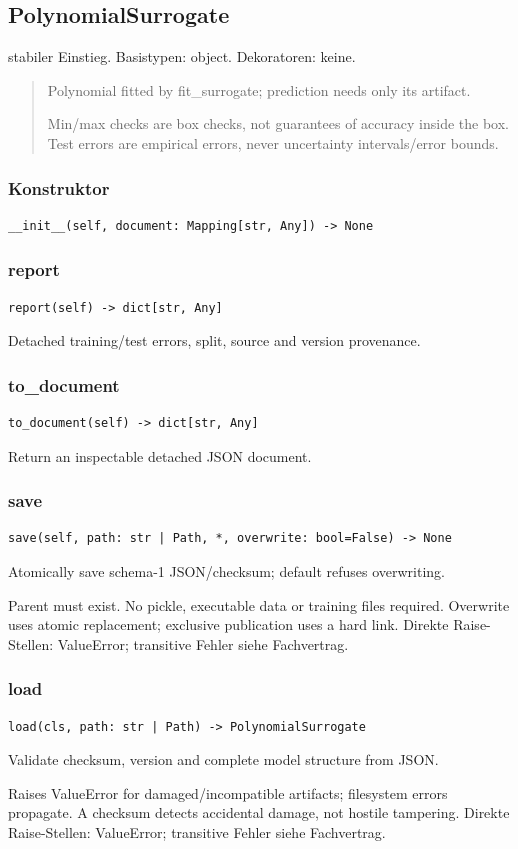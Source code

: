 \subsection{PolynomialSurrogate}
stabiler Einstieg.
Basistypen: object. Dekoratoren: keine.
\begin{quote}
Polynomial fitted by fit\_surrogate; prediction needs only its artifact.\par Min/max checks are box checks, not guarantees of accuracy inside the box. Test errors are empirical errors, never uncertainty intervals/error bounds.
\end{quote}
\subsubsection*{Konstruktor}
\begin{lstlisting}
__init__(self, document: Mapping[str, Any]) -> None
\end{lstlisting}
\subsubsection*{report}
\begin{lstlisting}
report(self) -> dict[str, Any]
\end{lstlisting}
Detached training/test errors, split, source and version provenance.
\subsubsection*{to\_document}
\begin{lstlisting}
to_document(self) -> dict[str, Any]
\end{lstlisting}
Return an inspectable detached JSON document.
\subsubsection*{save}
\begin{lstlisting}
save(self, path: str | Path, *, overwrite: bool=False) -> None
\end{lstlisting}
Atomically save schema-1 JSON/checksum; default refuses overwriting.\par Parent must exist. No pickle, executable data or training files required. Overwrite uses atomic replacement; exclusive publication uses a hard link.
Direkte Raise-Stellen: ValueError; transitive Fehler siehe Fachvertrag.
\subsubsection*{load}
\begin{lstlisting}
load(cls, path: str | Path) -> PolynomialSurrogate
\end{lstlisting}
Validate checksum, version and complete model structure from JSON.\par Raises ValueError for damaged/incompatible artifacts; filesystem errors propagate. A checksum detects accidental damage, not hostile tampering.
Direkte Raise-Stellen: ValueError; transitive Fehler siehe Fachvertrag.
